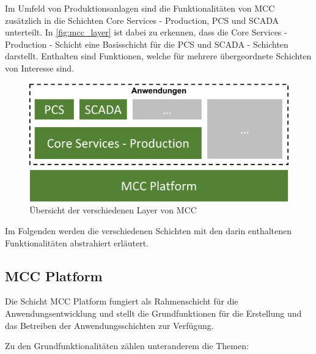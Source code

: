 Im Umfeld von Produktionsanlagen sind die Funktionalitäten von MCC zusätzlich in die Schichten \glqq Core Services - Production\grqq{}, \glqq PCS\grqq{} und \glqq SCADA\grqq{} unterteilt. In \autoref{fig:mcc_layer} ist dabei zu erkennen, dass die \glqq Core Services - Production\grqq{} - Schicht eine Basisschicht für die \glqq PCS\grqq{} und \glqq SCADA\grqq{} - Schichten darstellt. Enthalten sind Funktionen, welche für mehrere übergeordnete Schichten von Interesse sind.

\begin{figure}[H]
    \centering
    \includegraphics[width=0.7\linewidth]{images/MCC_Layer.png}
    \caption{Übersicht der verschiedenen Layer von MCC}
    \label{fig:mcc_layer}
\end{figure}

Im Folgenden werden die verschiedenen Schichten mit den darin enthaltenen Funktionalitäten abstrahiert erläutert.

\subsection{MCC Platform\label{subsec3.1.1:Unterunterpunkt-1}}

Die Schicht \glqq MCC Platform\grqq{} fungiert als Rahmenschicht für die Anwendungsentwicklung und stellt die Grundfunktionen für die Erstellung und das Betreiben der Anwendungsschichten zur Verfügung.

Zu den Grundfunktionalitäten zählen unteranderem die Themen:


